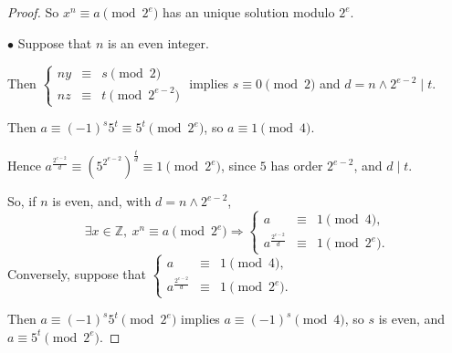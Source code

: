 \documentclass[11pt,a4paper]{article}
\newcommand{\Z}{\mathbb{Z}}
\begin{document}
\begin{proof}
So $x^n\equiv a \pmod{2^e}$ has an unique solution modulo $2^e$.

$\bullet$ Suppose that $n$ is an even integer. 

Then $\left\{
\begin{array}{ccl}
  ny& \equiv   &s \pmod{2}   \\
  nz& \equiv  &    t\pmod {2^{e-2}}
\end{array}
\right.
$ implies $s \equiv 0 \pmod 2$ and $d = n\wedge2^{e-2} \mid t$.

Then $a \equiv (-1)^s 5^t \equiv 5^t  \pmod {2^{e}}$, so $a\equiv 1 \pmod 4$.

 Hence $a^{\frac{2^{e-2}}{d}} \equiv \left(5^{2^{e-2}}\right)^{\frac{t}{d}}\equiv 1 \pmod {2^e}$, since $5$ has order $2^{e-2}$, and $d\mid t$. 
 
 So, if $n$ is even, and, with $d =  n\wedge2^{e-2}$, 
 $$\exists x \in \Z,\ x^n\equiv a \pmod{2^e} \Rightarrow 
 \left\{
 \begin{array}{ccl}
  a& \equiv   &1 \pmod{4},   \\
  a^{\frac{2^{e-2}}{d}} & \equiv  &    1 \pmod {2^{e}}.
\end{array}
\right.
$$
Conversely, suppose that $\left\{
 \begin{array}{ccl}
  a& \equiv   &1 \pmod{4},   \\
  a^{\frac{2^{e-2}}{d}} & \equiv  &    1 \pmod {2^{e}}.
\end{array}
\right.$

Then $a\equiv(-1)^s 5^t \pmod {2^e} $ implies $ a \equiv (-1)^s \pmod 4$, so $s$ is even, and $a \equiv 5^t \pmod{2^e}$.


\end{proof}
\end{document}
